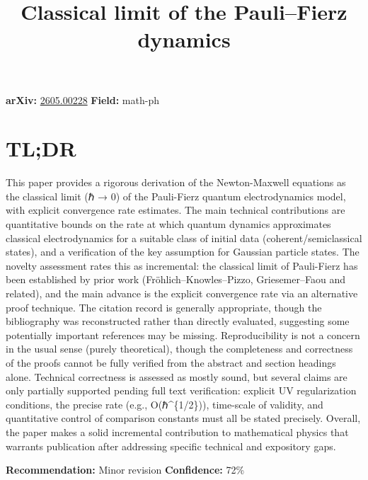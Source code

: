 \documentclass[11pt]{article}
\title{Classical limit of the Pauli--Fierz dynamics}
\date{}
\begin{document}
\maketitle

\noindent\textbf{arXiv:} \href{https://arxiv.org/abs/2605.00228}{2605.00228} \quad \textbf{Field:} math-ph\\

\section*{TL;DR}
This paper provides a rigorous derivation of the Newton-Maxwell equations as the classical limit (ℏ → 0) of the Pauli-Fierz quantum electrodynamics model, with explicit convergence rate estimates. The main technical contributions are quantitative bounds on the rate at which quantum dynamics approximates classical electrodynamics for a suitable class of initial data (coherent/semiclassical states), and a verification of the key assumption for Gaussian particle states. The novelty assessment rates this as incremental: the classical limit of Pauli-Fierz has been established by prior work (Fröhlich–Knowles–Pizzo, Griesemer–Faou and related), and the main advance is the explicit convergence rate via an alternative proof technique. The citation record is generally appropriate, though the bibliography was reconstructed rather than directly evaluated, suggesting some potentially important references may be missing. Reproducibility is not a concern in the usual sense (purely theoretical), though the completeness and correctness of the proofs cannot be fully verified from the abstract and section headings alone. Technical correctness is assessed as mostly sound, but several claims are only partially supported pending full text verification: explicit UV regularization conditions, the precise rate (e.g., O(ℏ\^{}\{1/2\})), time-scale of validity, and quantitative control of comparison constants must all be stated precisely. Overall, the paper makes a solid incremental contribution to mathematical physics that warrants publication after addressing specific technical and expository gaps.

\textbf{Recommendation:} Minor revision \quad \textbf{Confidence:} 72\%\\
\end{document}
